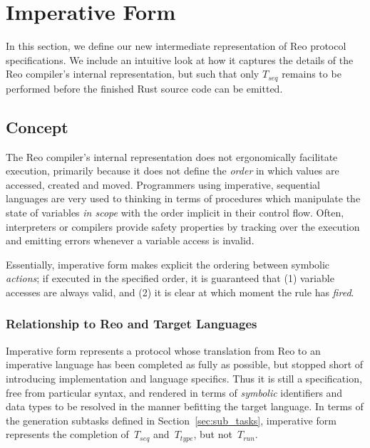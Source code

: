 \section{Imperative Form}
\label{sec:imperative_form_sec}
In this section, we define our new intermediate representation of Reo protocol specifications. We include an intuitive look at how it captures the details of the Reo compiler's internal representation, but such that only $T_{seq}$ remains to be performed before the finished Rust source code can be emitted.

\subsection{Concept}
The Reo compiler's internal representation does not ergonomically facilitate execution, primarily because it does not define the \textit{order} in which values are accessed, created and moved. Programmers using imperative, sequential languages are very used to thinking in terms of procedures which manipulate the state of variables \textit{in scope} with the order implicit in their control flow. Often, interpreters or compilers provide safety properties by tracking over the execution and emitting errors whenever a variable access is invalid.

Essentially, imperative form makes explicit the ordering between symbolic \textit{actions}; if executed in the specified order, it is guaranteed that (1) variable accesses are always valid, and (2) it is clear at which moment the rule has \textit{fired}.

\subsubsection{Relationship to Reo and Target Languages}
Imperative form represents a protocol whose translation from Reo to an imperative language has been completed as fully as possible, but stopped short of introducing implementation and language specifics. Thus it is still a specification, free from particular syntax, and rendered in terms of \textit{symbolic} identifiers and data types to be resolved in the manner befitting the target language. In terms of the generation subtasks defined in Section~\ref{sec:sub_tasks}, imperative form represents the completion of~$T_{seq}$ and~$T_{type}$, but not~$T_{run}$.

